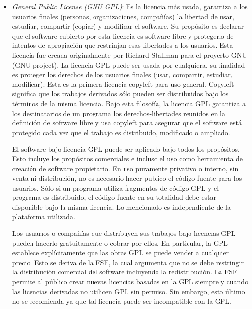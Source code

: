 \begin {itemize}
\item \textit{General Public License (GNU GPL)}: Es la licencia más
  usada, garantiza a los usuarios finales (personas, organizaciones,
  compañías) la libertad de usar, estudiar, compartir (copiar) y
  modificar el software. Su propósito es declarar que el software
  cubierto por esta licencia es software libre y protegerlo de
  intentos de apropiación que restrinjan esas libertades a los
  usuarios. Esta licencia fue creada originalmente por Richard
  Stallman para el proyecto GNU (GNU project). La licencia GPL puede
  ser usada por cualquiera, su finalidad es proteger los derechos de
  los usuarios finales (usar, compartir, estudiar, modificar). Esta es
  la primera licencia copyleft para uso general. Copyleft significa
  que los trabajos derivados sólo pueden ser distribuidos bajo los
  términos de la misma licencia. Bajo esta filosofía, la licencia GPL
  garantiza a los destinatarios de un programa los derechos-libertades
  reunidos en la definición de software libre y usa copyleft para
  asegurar que el software está protegido cada vez que el trabajo es
  distribuido, modificado o ampliado.

  El software bajo licencia GPL puede ser aplicado bajo todos los
  propósitos. Esto incluye los propósitos comerciales e incluso el uso
  como herramienta de creación de software propietario. En uso
  puramente privativo o interno, sin venta ni distribución, no es
  necesario hacer publico el código fuente para los usuarios. Sólo si
  un programa utiliza fragmentos de código GPL y el programa es
  distribuido, el código fuente en su totalidad debe estar disponible
  bajo la misma licencia. Lo mencionado es independiente de la
  plataforma utilizada. 

  Los usuarios o compañías que distribuyen sus trabajos bajo licencias
  GPL pueden hacerlo gratuitamente o cobrar por ellos. En particular,
  la GPL establece explícitamente que las obras GPL se puede vender a
  cualquier precio. Esto se deriva de la FSF, la cual argumenta que no
  se debe restringir la distribución comercial del software incluyendo
  la redistribución. La FSF permite al público crear nuevas licencias
  basadas en la GPL siempre y cuando las licencias derivadas no
  utilicen GPL sin permiso. Sin embargo, esto último no se recomienda
  ya que tal licencia puede ser incompatible con la GPL.


\end{itemize}
